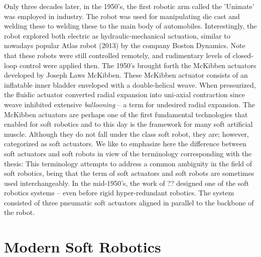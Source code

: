 Only three decades later, in the 1950's, the first robotic arm called the 'Unimate' was employed in industry. The robot was used for manipulating die cast and welding these to welding these to the main body of automobiles. Interestingly, the robot explored both electric as hydraulic-mechanical actuation, similar to nowadays popular Atlas robot (2013) by the company Boston Dynamics. Note that these robots were still controlled remotely, and rudimentary levels of closed-loop control were applied then. The 1950's brought forth the McKibben actuators developed by Joseph Laws McKibben. These McKibben actuator consists of an inflatable inner bladder enveloped with a double-helical weave. When pressurized, the fluidic actuator converted radial expansion into uni-axial contraction since weave inhibited extensive \emph{ballooning} -- a term for undesired radial expansion. The McKibben actuators are perhaps one of the first fundamental technologies that enabled for soft robotics and to this day is the framework for many soft artificial muscle. Although they do not fall under the class soft robot, they are; however, categorized as soft actuators. We like to emphasize here the difference between soft actuators and soft robots in view of the terminology corresponding with the thesis:
%
%
This terminology attempts to address a common ambiguity in the field of soft robotics, being that the term of soft actuators and soft robots are sometimes used interchangeably. In the mid-1950's, the work of ?? designed one of the soft robotics systems -- even before rigid hyper-redundant robotics. The system consisted of three pneumatic soft actuators aligned in parallel to the backbone of the robot. 

\section{Modern Soft Robotics}



